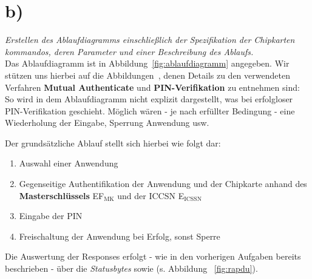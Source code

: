 \section{b)}

\textit{Erstellen des Ablaufdiagramms einschließlich der Spezifikation der Chipkarten
kommandos, deren Parameter und einer Beschreibung des Ablaufs.}\\

\noindent
Das Ablaufdiagramm ist in Abbildung~\ref{fig:ablaufdiagramm} angegeben.
Wir stützen uns hierbei auf die Abbildungen~\cite[\textbf{Abb. 3.3 und 3.4}, 46 f.]{ITS5}, denen Details zu den verwendeten Verfahren \textbf{Mutual Authenticate} und \textbf{PIN-Verifikation} zu entnehmen sind: So wird in dem Ablaufdiagramm nicht explizit dargestellt, was bei erfolgloser PIN-Verifikation geschieht. Möglich wären - je nach erfüllter Bedingung -  eine Wiederholung der Eingabe, Sperrung Anwendung usw.


\noindent
Der grundsätzliche Ablauf stellt sich hierbei wie folgt dar:

\begin{enumerate}
    \itemsep0.5em
    \item Auswahl einer Anwendung
    \item Gegenseitige Authentifikation der Anwendung und der Chipkarte anhand des \textbf{Masterschlüssels} EF$_{\text{MK}}$ und der ICCSN E$_\text{ICSSN}$
    \item Eingabe der PIN
    \item Freischaltung der Anwendung bei Erfolg, sonst Sperre
\end{enumerate}

\noindent
Die Auswertung der Responses erfolgt - wie in den vorherigen Aufgaben bereits beschrieben - über die \textit{Statusbytes}  sowie  (s. Abbildung ~\ref{fig:rapdu}).


